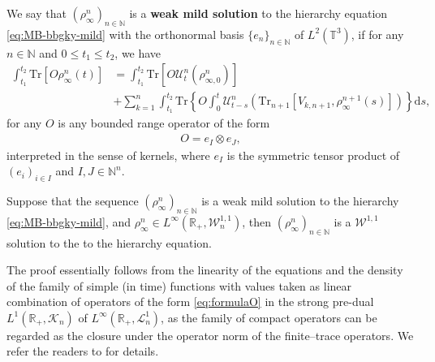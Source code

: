 We say that $(\rho^n_{\infty})_{n \in \mathbb{N}}$ is a
\textbf{weak mild solution} to the hierarchy equation \eqref{eq:MB-bbgky-mild} with the orthonormal basis $\{ e_n \}_{n \in \mathbb{N}}$ of $L^2 (\mathbb{T}^3)$, if for any $n \in \mathbb{N}$ and $0 \leqslant
t_1 \leqslant t_2$, we have
\begin{align}\label{eq:mainweakmild}
  \int_{t_1}^{t_2} \mathrm{Tr}\left[O\rho^n_{\infty} (t)\right] & =  \int_{t_1}^{t_2}\mathrm{Tr}\left[O\mathcal{U}^n_t (\rho^n_{\infty, 0})\right]\nonumber\\
  & + \sum_{k =
    1}^n \int_{t_1}^{t_2} \mathrm{Tr}\left\{O\int^t_0 \mathcal{U}^n_{t - s} \left(\mathrm{Tr}_{n + 1} \left[V_{k, n + 1},
    \rho^{n + 1}_{\infty} (s)\right]\right)\right\} \mathrm{d}s,
\end{align}
for any $O$ is any bounded range operator of the form
\begin{align}\label{eq:formulaO}
  O = e_{I} \otimes e_{J}, 
\end{align}
interpreted in the sense of kernels, where $e_{I}$ is the symmetric tensor product of $(e_i)_{i \in
I}$ and $I,J \in \mathbb{N}^n$.
\begin{lem}
  \label{lem:weakmild}Suppose that the sequence $(\rho_{\infty}^n)_{n \in
  \mathbb{N}}$ is a weak mild solution to the hierarchy
  \eqref{eq:MB-bbgky-mild}, and $\rho_{\infty}^n \in L^{\infty} (\mathbb{R}_+,
  \mathcal{W}^{1, 1}_n)$, then $(\rho_{\infty}^n)_{n \in \mathbb{N}}$ is a
  $\mathcal{W}^{1, 1}$ solution to the to the hierarchy equation.
\end{lem}
The proof essentially follows from the linearity of the equations and the density of the family of simple (in time) functions with values taken as linear combination of operators of the form \eqref{eq:formulaO} in the strong pre-dual $L^1 (\mathbb{R}_+, \mathcal{K}_n)$ of $L^{\infty}(\mathbb{R}_+, \mathcal{L}^1_n)$, as the family of compact operators can be regarded as the closure under the operator norm of the finite--trace operators. We refer the readers to \cite[Lemma 6.13]{de2025stochastic} for details.


